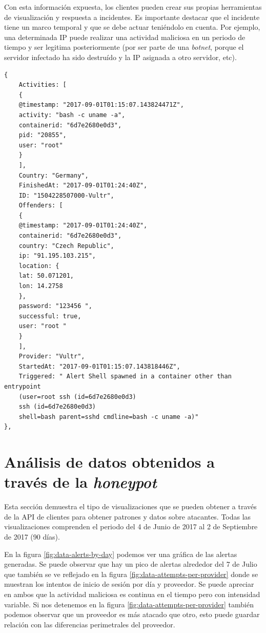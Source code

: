 Con esta información expuesta, los clientes pueden crear sus propias herramientas de visualización y respuesta a incidentes. Es importante destacar que 
el incidente tiene un marco temporal y que se debe actuar teniéndolo en cuenta. Por ejemplo, una determinada IP puede realizar una actividad maliciosa en un 
periodo de tiempo y ser legitima posteriormente (por ser parte de una \emph{botnet}, porque el servidor infectado ha sido destruído y la IP asignada a otro servidor, etc).

\begin{verbatim}    
{
    Activities: [
    {
    @timestamp: "2017-09-01T01:15:07.143824471Z",
    activity: "bash -c uname -a",
    containerid: "6d7e2680e0d3",
    pid: "20855",
    user: "root"
    }
    ],
    Country: "Germany",
    FinishedAt: "2017-09-01T01:24:40Z",
    ID: "1504228507000-Vultr",
    Offenders: [
    {
    @timestamp: "2017-09-01T01:24:40Z",
    containerid: "6d7e2680e0d3",
    country: "Czech Republic",
    ip: "91.195.103.215",
    location: {
    lat: 50.071201,
    lon: 14.2758
    },
    password: "123456 ",
    successful: true,
    user: "root "
    }
    ],
    Provider: "Vultr",
    StartedAt: "2017-09-01T01:15:07.143818446Z",
    Triggered: " Alert Shell spawned in a container other than entrypoint 
    (user=root ssh (id=6d7e2680e0d3) 
    ssh (id=6d7e2680e0d3) 
    shell=bash parent=sshd cmdline=bash -c uname -a)"
},
\end{verbatim}
\bigskip


\section{Análisis de datos obtenidos a través de la \emph{honeypot}}

Esta sección demuestra el tipo de visualizaciones que se pueden obtener a través de la API de clientes para obtener
patrones y datos sobre atacantes. Todas las visualizaciones comprenden el periodo del 4 de Junio de 2017 al 2 de Septiembre de
2017 (90 días).

En la figura \ref{fig:data-alerts-by-day} podemos ver una gráfica de las alertas generadas. Se puede observar que hay un pico de 
alertas alrededor del 7 de Julio que también se ve reflejado en la figura \ref{fig:data-attempts-per-provider} donde se muestran
los intentos de inicio de sesión por día y proveedor.
    Se puede apreciar en ambos que la actividad maliciosa es continua en el tiempo pero con intensidad variable. Si nos detenemos en la figura \ref{fig:data-attempts-per-provider} también podemos observar
 que un proveedor es más atacado que otro, esto puede guardar relación con las diferencias
perimetrales del proveedor.

